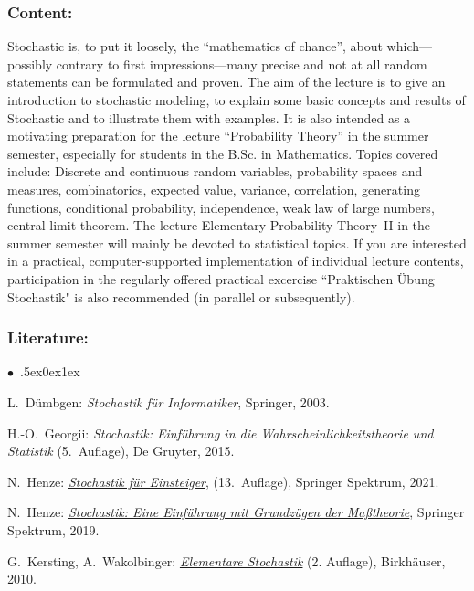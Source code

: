 \documentclass[a4paper,10pt]{article}
\renewenvironment{itemize}{\begin{list}{$\bullet$\ }{\itemsep.5ex\setlength{\topsep}{0.5\itemsep}\parsep0ex\labelsep1ex\settowidth{\labelwidth}{$\bullet$\ }\setlength{\leftmargin}{\labelwidth}\addtolength{\leftmargin}{3ex}\addtolength{\leftmargin}{\labelsep}}}{\end{list}}
\begin{document}
\subsubsection*{\large
    Content:
}
Stochastic is, to put it loosely, the “mathematics of chance”, about which---possibly contrary to first impressions---many precise and not at all random statements can be formulated and proven. The aim of the lecture is to give an introduction to stochastic modeling, to explain some basic concepts and results of Stochastic and to illustrate them with examples. It is also intended as a motivating preparation for the lecture “Probability Theory” in the summer semester, especially for students in the B.Sc. in Mathematics. Topics covered include: Discrete and continuous random variables, probability spaces and measures, combinatorics, expected value, variance, correlation, generating functions, conditional probability, independence, weak law of large numbers, central limit theorem.
The lecture Elementary Probability Theory~II in the summer semester will mainly be devoted to statistical topics. If you are interested in a practical, computer-supported implementation of individual lecture contents, participation in the regularly offered practical excercise “Praktischen Übung Stochastik" is also recommended (in parallel or subsequently).
\subsubsection*{\large
    Literature:
}
\begin{itemize}
\item L.~Dümbgen: \emph{Stochastik für Informatiker}, Springer, 2003.
\item H.-O.~Georgii: \emph{Stochastik: Einführung in die Wahrscheinlichkeitstheorie und Statistik} (5.~Auf\/lage), De Gruyter, 2015.
\item N.~Henze: \href{https://www.redi-bw.de/start/unifr/EBooks-springer/10.1007/978-3-662-63840-8}{\emph{Stochastik für Einsteiger}}, (13.~Auf\/lage), Springer Spektrum, 2021. 
\item  N.~Henze: \href{https://www.redi-bw.de/start/unifr/EBooks-springer/10.1007/978-3-662-59563-3}{\emph{Stochastik: Eine Einführung mit Grundzügen der Maßtheorie}}, Springer Spektrum, 2019. 
\item  G.~Kersting, A.~Wakolbinger: \href{http://www.redi-bw.de/start/unifr/EBooks-springer/10.1007/978-3-0346-0414-7}{\emph{Elementare Stochastik}} (2. Auf\/lage), Birkhäuser, 2010. 
\end{itemize}
\end{document}
